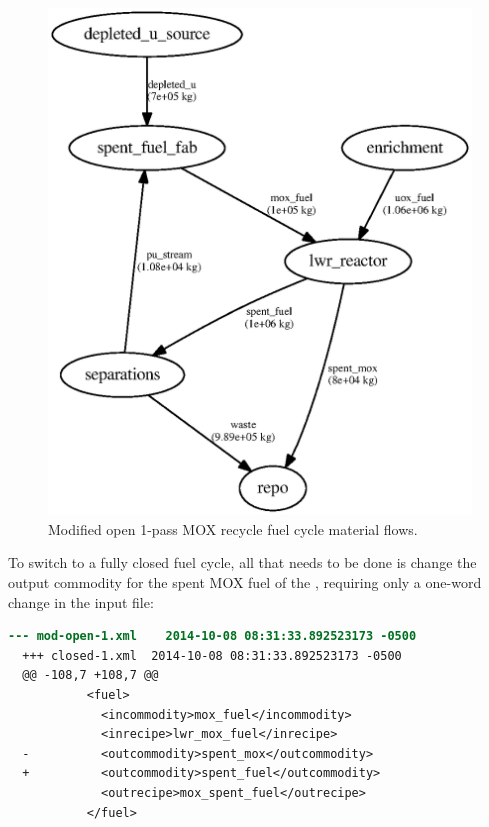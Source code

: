 \begin{figure}[H]
\caption{Modified open 1-pass \gls{MOX} recycle fuel cycle material flows.}
\begin{center}
\includegraphics{./images/flow-mod-open-1.eps}
\end{center}
\label{fig:flowmodopen}
\end{figure}

To switch to a fully closed fuel cycle, all that needs to be done is change
the output commodity for the spent \gls{MOX} fuel of the , 
requiring only a one-word change in the input file: 

\begin{lstlisting}[language=diff]
  --- mod-open-1.xml	2014-10-08 08:31:33.892523173 -0500
  +++ closed-1.xml	2014-10-08 08:31:33.892523173 -0500
  @@ -108,7 +108,7 @@
           <fuel>         
             <incommodity>mox_fuel</incommodity>
             <inrecipe>lwr_mox_fuel</inrecipe>
  -          <outcommodity>spent_mox</outcommodity>
  +          <outcommodity>spent_fuel</outcommodity>
             <outrecipe>mox_spent_fuel</outrecipe>
           </fuel>
\end{lstlisting}

